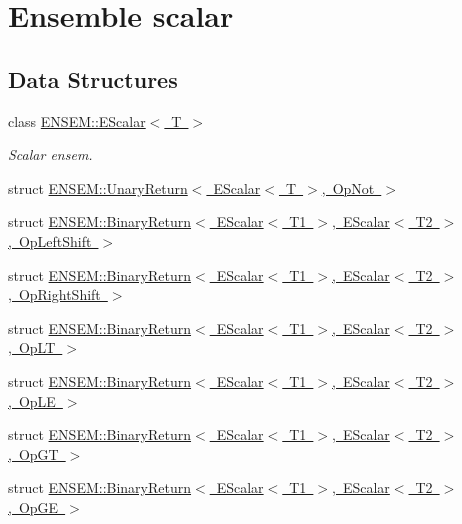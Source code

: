 \hypertarget{group__escalar}{}\section{Ensemble scalar}
\label{group__escalar}
\subsection*{Data Structures}
\begin{DoxyCompactItemize}
\item 
class \mbox{\hyperlink{classENSEM_1_1EScalar}{E\+N\+S\+E\+M\+::\+E\+Scalar$<$ T $>$}}
\begin{DoxyCompactList}\small\item\em Scalar ensem. \end{DoxyCompactList}\item 
struct \mbox{\hyperlink{structENSEM_1_1UnaryReturn_3_01EScalar_3_01T_01_4_00_01OpNot_01_4}{E\+N\+S\+E\+M\+::\+Unary\+Return$<$ E\+Scalar$<$ T $>$, Op\+Not $>$}}
\item 
struct \mbox{\hyperlink{structENSEM_1_1BinaryReturn_3_01EScalar_3_01T1_01_4_00_01EScalar_3_01T2_01_4_00_01OpLeftShift_01_4}{E\+N\+S\+E\+M\+::\+Binary\+Return$<$ E\+Scalar$<$ T1 $>$, E\+Scalar$<$ T2 $>$, Op\+Left\+Shift $>$}}
\item 
struct \mbox{\hyperlink{structENSEM_1_1BinaryReturn_3_01EScalar_3_01T1_01_4_00_01EScalar_3_01T2_01_4_00_01OpRightShift_01_4}{E\+N\+S\+E\+M\+::\+Binary\+Return$<$ E\+Scalar$<$ T1 $>$, E\+Scalar$<$ T2 $>$, Op\+Right\+Shift $>$}}
\item 
struct \mbox{\hyperlink{structENSEM_1_1BinaryReturn_3_01EScalar_3_01T1_01_4_00_01EScalar_3_01T2_01_4_00_01OpLT_01_4}{E\+N\+S\+E\+M\+::\+Binary\+Return$<$ E\+Scalar$<$ T1 $>$, E\+Scalar$<$ T2 $>$, Op\+L\+T $>$}}
\item 
struct \mbox{\hyperlink{structENSEM_1_1BinaryReturn_3_01EScalar_3_01T1_01_4_00_01EScalar_3_01T2_01_4_00_01OpLE_01_4}{E\+N\+S\+E\+M\+::\+Binary\+Return$<$ E\+Scalar$<$ T1 $>$, E\+Scalar$<$ T2 $>$, Op\+L\+E $>$}}
\item 
struct \mbox{\hyperlink{structENSEM_1_1BinaryReturn_3_01EScalar_3_01T1_01_4_00_01EScalar_3_01T2_01_4_00_01OpGT_01_4}{E\+N\+S\+E\+M\+::\+Binary\+Return$<$ E\+Scalar$<$ T1 $>$, E\+Scalar$<$ T2 $>$, Op\+G\+T $>$}}
\item 
struct \mbox{\hyperlink{structENSEM_1_1BinaryReturn_3_01EScalar_3_01T1_01_4_00_01EScalar_3_01T2_01_4_00_01OpGE_01_4}{E\+N\+S\+E\+M\+::\+Binary\+Return$<$ E\+Scalar$<$ T1 $>$, E\+Scalar$<$ T2 $>$, Op\+G\+E $>$}}

\end{DoxyCompactItemize}
